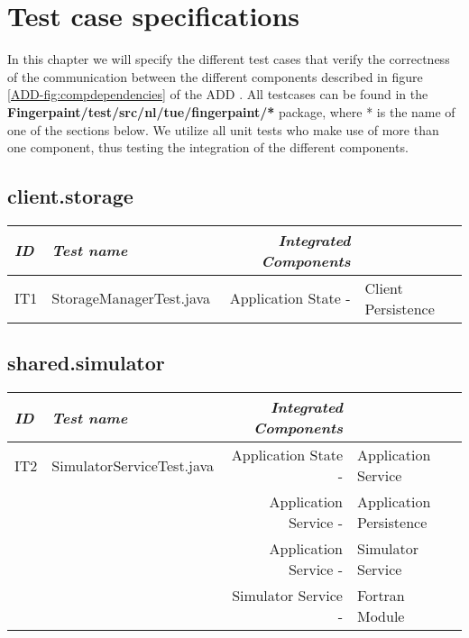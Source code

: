 \chapter{Test case specifications}
\label{chap:testSpecs}

In this chapter we will specify the different test cases that verify the correctness of the communication between the different components described in figure \ref{ADD-fig:compdependencies} of the ADD \cite{add}. All testcases can be found in the \textbf{Fingerpaint/test/src/nl/tue/fingerpaint/*} package, where * is the name of one of the sections below. We utilize all unit tests who make use of more than one component, thus testing the integration of the different components.

\section{client.storage}
\begin{tabular}{llrl}
\emph{ID} & \emph{Test name} & \emph{Integrated Components} & \\
\hline
IT1 & StorageManagerTest.java & Application State - & Client Persistence \\
\end{tabular}

\section{shared.simulator}
\begin{tabular}{llrl}
\emph{ID} & \emph{Test name} & \emph{Integrated Components} & \\
\hline
IT2 & SimulatorServiceTest.java & Application State - & Application Service \\
& & Application Service - & Application Persistence\\
& & Application Service - & Simulator Service\\
& & Simulator Service - & Fortran Module\\
\end{tabular}


